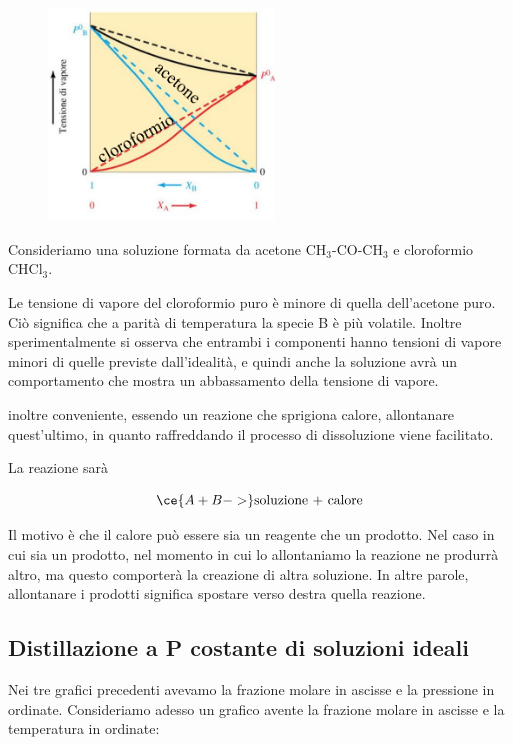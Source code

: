 \vspace{-0.2cm}\begin{minipage}{0.4\textwidth}
    \begin{figure}[H]
        \includegraphics[width=6cm]{immagini/tensione_di_vapore_sol_esotermica.png}
    \end{figure}
\end{minipage}
\begin{minipage}{0.6\textwidth}
    Consideriamo una soluzione formata da acetone CH$_3$-CO-CH$_3$ e cloroformio CHCl$_3$.

    Le tensione di vapore del cloroformio puro è minore di quella dell'acetone puro. Ciò significa che a parità di temperatura la specie B è più volatile. Inoltre sperimentalmente si osserva che entrambi i componenti hanno tensioni di vapore minori di quelle previste dall'idealità, e quindi anche la soluzione avrà un comportamento che mostra un abbassamento della tensione di vapore.
\end{minipage}
\E inoltre conveniente, essendo un reazione che sprigiona calore, allontanare quest'ultimo, in quanto raffreddando il processo di dissoluzione viene facilitato.

La reazione sarà

$$\ce{A + B ->} \text{soluzione + calore}$$

Il motivo è che il calore può essere sia un reagente che un prodotto. Nel caso in cui sia un prodotto, nel momento in cui lo allontaniamo la reazione ne produrrà altro, ma questo comporterà la creazione di altra soluzione. In altre parole, allontanare i prodotti significa spostare verso destra quella reazione.
\subsection{Distillazione a P costante di soluzioni ideali}
Nei tre grafici precedenti avevamo la frazione molare in ascisse e la pressione in ordinate. Consideriamo adesso un grafico avente la frazione molare in ascisse e la temperatura in ordinate:

